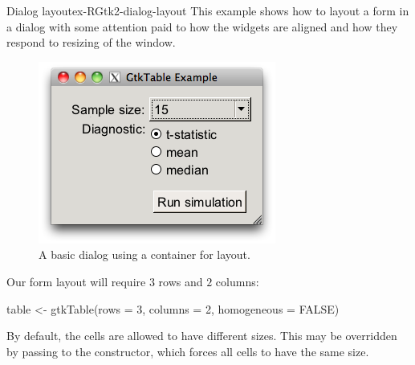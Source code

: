 \begin{example}{Dialog layout}{ex-RGtk2-dialog-layout}
This example shows how to layout a form in a dialog with some
attention paid to how the widgets are aligned and how they respond to
resizing of the window.

\begin{figure}
  \centering
  \includegraphics[width=.5\textwidth]{fig-RGtk2-gtktable-example.png}
  \caption{A basic dialog using a  container for layout.}
  \label{fig:RGtk2-dialog-layout}
\end{figure}

Our form layout will require $3$ rows and $2$ columns:
\begin{Schunk}
\begin{Sinput}
 table <- gtkTable(rows = 3, columns = 2, homogeneous = FALSE)
\end{Sinput}
\end{Schunk}
%
By default, the cells are allowed to have different sizes. This may be
overridden by passing  to the constructor,
which forces all cells to have the same size.


\end{example}
